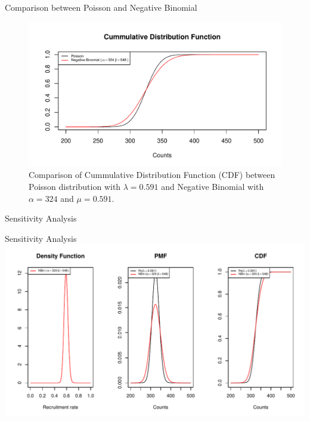 \documentclass[english]{beamer}\usepackage[]{graphicx}\usepackage[]{xcolor}
\makeatletter
\def\maxwidth{ %
  \ifdim\Gin@nat@width>\linewidth
    \linewidth
  \else
    \Gin@nat@width
  \fi
}
\newenvironment{knitrout}{}{} %
\makeatother
\begin{document}
\begin{frame}{Comparison between Poisson and Negative Binomial}

\begin{figure}
\begin{knitrout}
\color{fgcolor}
\includegraphics[width=\maxwidth]{figures/figunnamed-chunk-10-1} 
\end{knitrout}
  \caption{Comparison of Cummulative Distribution Function (CDF) between Poisson distribution with $\lambda = 0.591$ and Negative Binomial with $\alpha = 324$ and $\mu = 0.591$.}
  \label{fig:2_7}
\end{figure}

\end{frame}

\begin{frame}{Sensitivity Analysis}


\end{frame}


\begin{frame}{Sensitivity Analysis}
\begin{knitrout}
\color{fgcolor}
\includegraphics[width=\maxwidth]{figures/figunnamed-chunk-11-1} 
\end{knitrout}

\end{frame}
\end{document}
